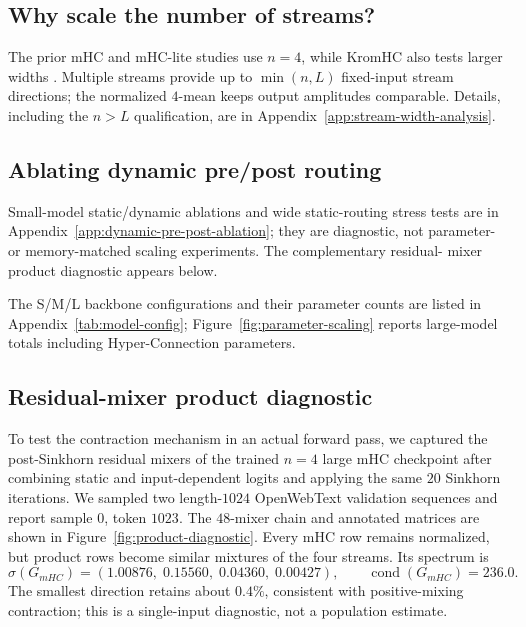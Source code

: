 \documentclass{article}
\begin{document}
\subsection{Why scale the number of streams?}
The prior mHC and mHC-lite studies use $n=4$, while KromHC also tests larger
widths \citep{xie2026mhc,yang2026mhclite,zhou2026kromhc}. Multiple streams provide
up to $\min(n,L)$ fixed-input stream directions; the normalized $4$-mean keeps
output amplitudes comparable. Details, including the $n>L$ qualification, are in
Appendix~\ref{app:stream-width-analysis}.

\subsection{Ablating dynamic pre/post routing}
\label{sec:dynamic-pre-post-ablation}
Small-model static/dynamic ablations and wide static-routing stress tests are in
Appendix~\ref{app:dynamic-pre-post-ablation}; they are diagnostic, not
parameter- or memory-matched scaling experiments. The complementary residual-
mixer product diagnostic appears below.

The S/M/L backbone configurations and their parameter counts are listed in
Appendix~\ref{tab:model-config}; Figure~\ref{fig:parameter-scaling} reports
large-model totals including Hyper-Connection parameters.

\subsection{Residual-mixer product diagnostic}
\label{sec:dynamic-h-res-diagnostic}
To test the contraction mechanism in an actual forward pass, we captured the
post-Sinkhorn residual mixers of the trained $n=4$ large mHC checkpoint after
combining static and input-dependent logits and applying the same $20$ Sinkhorn
iterations. We sampled two length-$1024$ OpenWebText validation sequences and
report sample 0, token $1023$. The $48$-mixer chain and annotated matrices are
shown in Figure~\ref{fig:product-diagnostic}. Every mHC row remains normalized,
but product rows become similar mixtures of the four streams. Its spectrum is
\begin{equation}
 \sigma(G_{mHC})=(1.00876,\;0.15560,\;0.04360,\;0.00427),
 \qquad \operatorname{cond}(G_{mHC})=236.0.
 \label{eq:dynamic-mhc-product-spectrum}
\end{equation}
The smallest direction retains about $0.4\%$, consistent with positive-mixing
contraction; this is a single-input diagnostic, not a population estimate.
\end{document}
